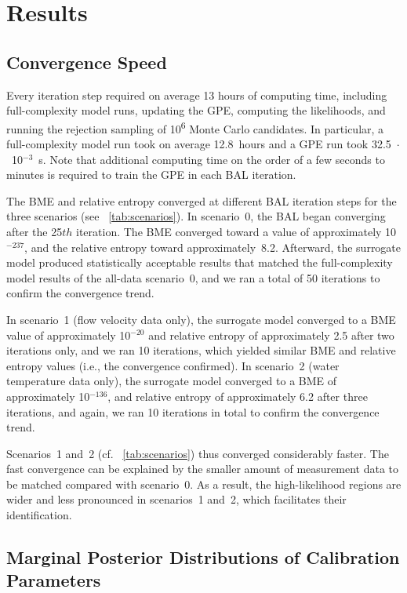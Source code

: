 \documentclass[draft,linenumbers,onecolumn]{agujournal2019} %
\begin{document}
\section{Results}

\subsection{Convergence Speed}
Every iteration step required on average 13 hours of computing time, including full-complexity model runs, updating the GPE, computing the likelihoods, and running the rejection sampling of 10\textsuperscript{6} Monte Carlo candidates. In particular, a full-complexity model run took on average 12.8~hours and a GPE run took 32.5~$\cdot$~10$^{-3}$~s. Note that additional computing time on the order of a few seconds to minutes is required to train the GPE in each BAL iteration.

The BME and relative entropy converged at different BAL iteration steps for the three scenarios (see \tablename{~\ref{tab:scenarios}}). In scenario~0, the BAL began converging after the 25${th}$ iteration. The BME converged toward a value of approximately 10$^{-237}$, and the relative entropy toward approximately~8.2. Afterward, the surrogate model produced statistically acceptable results that matched the full-complexity model results of the all-data scenario~0, and we ran a total of 50 iterations to confirm the convergence trend.

In scenario~1 (flow velocity data only), the surrogate model converged to a BME value of approximately 10$^{-20}$ and relative entropy of approximately 2.5 after two iterations only, and we ran 10 iterations, which yielded similar BME and relative entropy values (i.e., the convergence confirmed). In scenario~2 (water temperature data only), the surrogate model converged to a BME of approximately 10$^{-136}$, and relative entropy of approximately 6.2 after three iterations, and again, we ran 10 iterations in total to confirm the convergence trend.

Scenarios~1 and~2 (cf. \tablename{~\ref{tab:scenarios}}) thus converged considerably faster. The fast convergence can be explained by the smaller amount of measurement data to be matched compared with scenario~0. As a result, the high-likelihood regions are wider and less pronounced in scenarios~1 and~2, which facilitates their identification.

\subsection{Marginal Posterior Distributions of Calibration Parameters}
\end{document}
